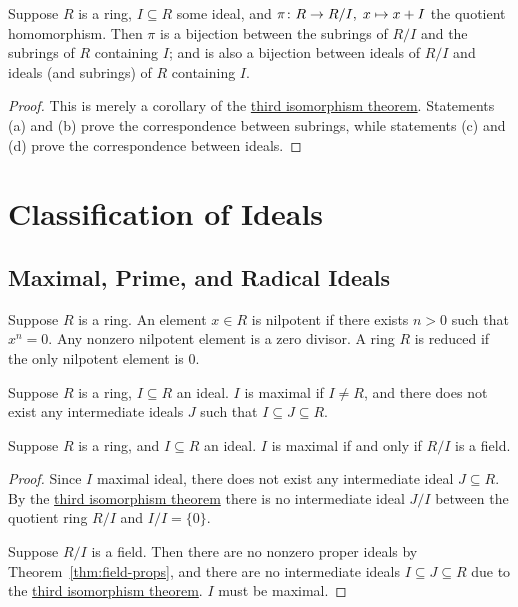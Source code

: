 \begin{theorem}\label{thm:iso-4-ring}
    Suppose \(R\) is a ring, \(I \subseteq R\) some ideal,
    and \(\pi\colon R\to R/I,\;x\mapsto x+I\) the quotient homomorphism.
    Then \(\pi\) is a bijection between the subrings of \(R/I\)
    and the subrings of \(R\) containing \(I\);
    and is also a bijection between ideals of \(R/I\)
    and ideals (and subrings) of \(R\) containing \(I\).
\end{theorem}
\begin{proof}
    This is merely a corollary of
    the \hyperref[thm:iso-3-ring]{third isomorphism theorem}.
    Statements (a) and (b) prove the correspondence between subrings,
    while statements (c) and (d) prove the correspondence between ideals.
\end{proof}


\section{Classification of Ideals}

\subsection*{Maximal, Prime, and Radical Ideals}

\begin{definition}
    Suppose \(R\) is a ring.
    An element \(x \in R\) is nilpotent if there exists \(n > 0\) such that \(x^n = 0\).
    Any nonzero nilpotent element is a zero divisor.
    A ring \(R\) is reduced if the only nilpotent element is 0.
\end{definition}

\begin{definition}
    Suppose \(R\) is a ring, \(I \subseteq R\) an ideal.
    \(I\) is maximal if \(I \neq R\),
    and there does not exist any intermediate ideals \(J\)
    such that \(I \subseteq J \subseteq R\).
\end{definition}
\begin{theorem}\label{thm:maximal-quotient-field}
    Suppose \(R\) is a ring,
    and \(I \subseteq R\) an ideal.
    \(I\) is maximal if and only if \(R/I\) is a field.
\end{theorem}
\begin{proof}
    Since \(I\) maximal ideal,
    there does not exist any intermediate ideal \(J \subseteq R\).
    By the \hyperref[thm:iso-3-ring]{third isomorphism theorem}
    there is no intermediate ideal \(J/I\)
    between the quotient ring \(R/I\) and \(I/I = \{0\}\).

    Suppose \(R/I\) is a field.
    Then there are no nonzero proper ideals by Theorem~\ref{thm:field-props},
    and there are no intermediate ideals \(I \subseteq J \subseteq R\)
    due to the \hyperref[thm:iso-3-ring]{third isomorphism theorem}.
    \(I\) must be maximal.
\end{proof}

